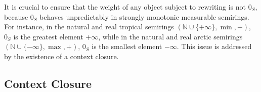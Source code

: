 It is crucial to ensure that the weight of any object subject to rewriting is not $0_S$, because \(0_S\) behaves unpredictably in strongly monotonic measurable semirings. For instance, in the natural and real tropical semirings \((\mathbb{N} \cup \{+\infty\}, \min, +)\), \(0_S\) is the greatest element \(+\infty\), while in the natural and real arctic semirings \((\mathbb{N} \cup \{-\infty\}, \max, +)\), \(0_S\) is the smallest element \(-\infty\).
This issue is addressed by the existence of a context closure. 

\subsection{Context Closure}
\label{sec:context_closure}


